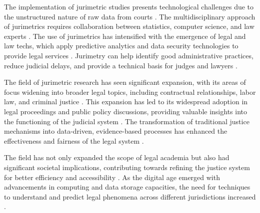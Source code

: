 The implementation of jurimetric studies presents technological challenges due to the unstructured nature of raw data from courts \cite{103390fi9040068}. The multidisciplinary approach of jurimetrics requires collaboration between statistics, computer science, and law experts \cite{103390fi9040068}. The use of jurimetrics has intensified with the emergence of legal and law techs, which apply predictive analytics and data security technologies to provide legal services \cite{silva2023role}. Jurimetry can help identify good administrative practices, reduce judicial delays, and provide a technical basis for judges and lawyers \cite{silva2023role}.

The field of jurimetric research has seen significant expansion, with its areas of focus widening into broader legal topics, including contractual relationships, labor law, and criminal justice \cite{10.1007/s11186-021-09453-1,international2015}. This expansion has led to its widespread adoption in legal proceedings and public policy discussions, providing valuable insights into the functioning of the judicial system \cite{10.1007/s11186-021-09453-1,zabala2019decades,10.3390/fi9040068}. The transformation of traditional justice mechanisms into data-driven, evidence-based processes has enhanced the effectiveness and fairness of the legal system \cite{10.1007/s11186-021-09453-1,10.3390/fi9040068}.

The field has not only expanded the scope of legal academia but also had significant societal implications, contributing towards refining the justice system for better efficiency and accessibility \cite{loevinger1959,10.3390/fi9040068,10.1080/07329113.2015.1046739,10.5040/9781350220645,de2010jurimetrics,zabala2019decades,10.1057/s41599-020-00557-0,in the lawviewmetadatacitationsimilarpapers2014,10.1590/data.2022.65.3.267,10.2307/2654208,demortain2019politics,10.1057/s41599-020-0396-5,10.1007/s11186-021-09453-1,comptabilitat0018,salais2016quantification,10.1017/s0003975609000150,supiot2018,nunes2016jurimetrics,10.1007/s11186-021-09453-1}. As the digital age emerged with advancements in computing and data storage capacities, the need for techniques to understand and predict legal phenomena across different jurisdictions increased \cite{10.5040/9781350220645,zabala2019decades,10.1007/s11186-021-09453-1,unger2021process,10.3390/fi9040068,10.1080/07329113.2015.1046739,10.1590/data.2022.65.3.267,loevinger1959,10.2307/2654208,demortain2019politics,10.1057/s41599-020-0396-5,10.1057/s41599-020-00557-0,comptabilitat0018,salais2016quantification}.


